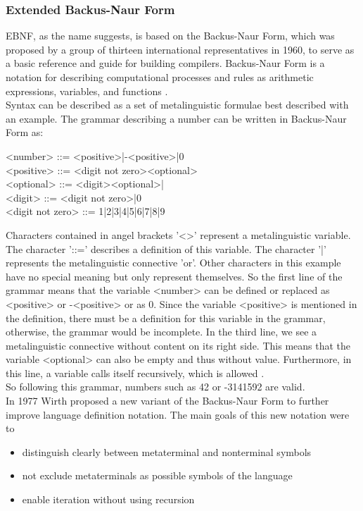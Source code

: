 \subsubsection{Extended Backus-Naur Form}\label{sec:EBNF}
\ac{EBNF}, as the name suggests, is based on the Backus-Naur Form, which was proposed by a group of thirteen international representatives in 1960, to serve as a basic reference and guide for building compilers. Backus-Naur Form is a notation for describing computational processes and rules as arithmetic expressions, variables, and functions \parencite[cf.][p. 300]{backus_report_1960}.\\
Syntax can be described as a set of metalinguistic formulae best described with an example. The grammar describing a number can be written in Backus-Naur Form as:
\begin{grammar}
    <number> ::= <positive>|-<positive>|0 \\
    <positive> ::= <digit not zero><optional> \\
    <optional> ::= <digit><optional>| \\
    <digit> ::= <digit not zero>|0 \\
    <digit not zero> ::= 1|2|3|4|5|6|7|8|9
\end{grammar}
Characters contained in angel brackets '<>' represent a metalinguistic variable. The character '::=' describes a definition of this variable. The character '|' represents the metalinguistic connective 'or'. Other characters in this example have no special meaning but only represent themselves. So the first line of the grammar means that the variable <number> can be defined or replaced as <positive> or -<positive> or as 0. Since the variable <positive> is mentioned in the definition, there must be a definition for this variable in the grammar, otherwise, the grammar would be incomplete. In the third line, we see a metalinguistic connective without content on its right side. This means that the variable <optional> can also be empty and thus without value. Furthermore, in this line, a variable calls itself recursively, which is allowed \parencite[cf.][pp. 301-303]{backus_report_1960}.\\
So following this grammar, numbers such as 42 or -3141592 are valid.\\
In 1977 Wirth proposed a new variant of the Backus-Naur Form to further improve language definition notation. The main goals of this new notation were to \parencite[cf.][p. 822]{wirth_what_1977}
\begin{itemize}[noitemsep]
    \item distinguish clearly between metaterminal and nonterminal symbols
    \item not exclude metaterminals as possible symbols of the language
    \item enable iteration without using recursion
\end{itemize}
